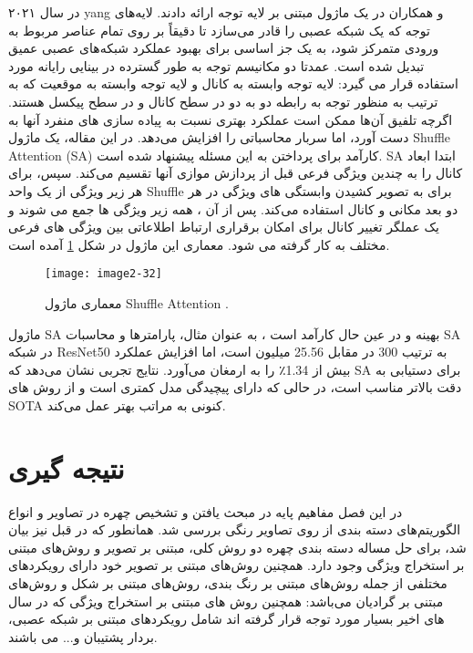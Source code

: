 در سال ۲۰۲۱ yang و همکاران در \cite{yang2021sanet} یک ماژول مبتنی بر لایه توجه ارائه دادند. لایه‌های توجه که یک شبکه عصبی را قادر می‌سازد تا دقیقاً بر روی تمام عناصر مربوط به ورودی متمرکز شود، به یک جز اساسی برای بهبود عملکرد شبکه‌های عصبی عمیق تبدیل شده است. عمدتا دو مکانیسم توجه به طور گسترده در بینایی رایانه مورد استفاده قرار می گیرد: لایه توجه وابسته به كانال  و لایه توجه وابسته به موقعيت  که به ترتیب به منظور توجه به رابطه دو به دو در سطح کانال و در سطح پیکسل هستند. اگرچه تلفیق آن‌ها ممکن است عملکرد بهتری نسبت به پیاده سازی های منفرد آنها به دست آورد‌، اما سربار محاسباتی را افزایش می‌دهد.
در این مقاله، یک ماژول Shuffle Attention (SA) کارآمد برای پرداختن به این مسئله پیشنهاد شده است. SA ابتدا ابعاد کانال را به چندین ویژگی فرعی قبل از پردازش موازی آنها تقسیم می‌کند. سپس، برای هر زیر ویژگی از یک واحد Shuffle برای به تصویر کشیدن وابستگی های ویژگی در هر دو بعد مکانی و کانال استفاده می‌کند. پس از آن ، همه زیر ویژگی ها جمع می شوند و یک عملگر تغییر کانال برای امکان برقراری ارتباط اطلاعاتی بین ویژگی های فرعی مختلف به کار گرفته می شود. معماری این ماژول در شکل \ref{image2-32} آمده است.
\begin{figure}[h]
\centering
  \texttt{[image: image2-32]}
  \caption{
  معماری ماژول Shuffle Attention
   \cite{Bianco_2018}.}
  \label{image2-32}
\end{figure}
\noindent
ماژول SA بهینه و در عین حال کارآمد است ، به عنوان مثال، پارامترها و محاسبات SA در شبکه ResNet50 به ترتیب 300 در مقابل 25.56 میلیون است، اما افزایش عملکرد بیش از 1.34٪ را به ارمغان می‌آورد. نتایج تجربی نشان می‌دهد که SA برای دستیابی به دقت بالاتر مناسب است، در حالی که دارای پیچیدگی مدل کمتری است و از روش های SOTA  کنونی به مراتب بهتر عمل می‌کند. 

\section{نتیجه گیری}
در این فصل مفاهیم‌ پایه در مبحث یافتن و تشخیص چهره در تصاویر و انواع الگوریتم‌های دسته ‌بندی از روی تصاویر رنگی بررسی شد. همانطور که در قبل نیز بیان شد، برای حل مساله دسته ‌بندی چهره دو روش کلی، مبتنی بر تصویر و روش‌های مبتنی بر استخراج ویژگی وجود دارد. همچنین روش‌های مبتنی بر تصویر خود دارای رویکردهای مختلفی از جمله روش‌های مبتنی بر رنگ‌ بندی، روش‌های مبتنی بر شکل و روش‌های مبتنی بر گرادیان می‌باشد: همچنین روش های مبتنی بر استخراج ویژگی که در سال های اخیر بسیار مورد توجه قرار گرفته اند شامل رویکردهای مبتنی بر شبکه عصبی، بردار پشتیبان و... می باشند.

